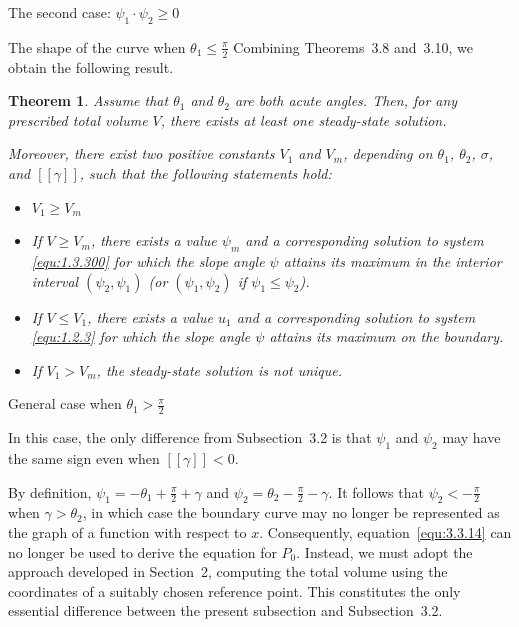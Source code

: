 \documentclass[letterpaper,reqno,10pt,twoside]{amsart}
\newtheorem{theorem}{Theorem}[section]
\theoremstyle{definition}
\theoremstyle{remark}
\begin{document}
\begin{section}{The second case: $\psi_1\cdot \psi_2\geq 0$ }
\begin{subsection}{The shape of the curve when $\theta_1\leq \frac{\pi}{2}$}
        Combining Theorems~3.8 and~3.10, we obtain the following result.


        \begin{theorem}

            Assume that $\theta_1$ and $\theta_2$ are both acute angles. Then, for any prescribed total volume $V$, there exists at least one steady-state solution.

Moreover, there exist two positive constants $V_1$ and $V_m$, depending on $\theta_1$, $\theta_2$, $\sigma$, and $[\![\gamma]\!]$, such that the following statements hold:
\begin{itemize}
\item $V_{1}\geq V_{m}$
\item If $V \ge V_m$, there exists a value $\psi_m$ and a corresponding solution to system \eqref{equ:1.3.300} for which the slope angle $\psi$ attains its maximum in the interior interval $(\psi_2,\psi_1)$ (or $(\psi_1,\psi_2)$ if $\psi_1 \le \psi_2$).

\item If $V \le V_1$, there exists a value $u_1$ and a corresponding solution to system \eqref{equ:1.2.3} for which the slope angle $\psi$ attains its maximum on the boundary.

\item If $V_1 > V_m$, the steady-state solution is not unique.
            \end{itemize}
            
            
        \end{theorem}
        
        \end{subsection}

        \begin{subsection}{General case when $\theta_1>\frac{\pi}{2}$}

            In this case, the only difference from Subsection~3.2 is that $\psi_1$ and $\psi_2$ may have the same sign even when $[\![\gamma]\!]<0$. 

            By definition, $\psi_1=-\theta_1+\frac{\pi}{2}+\gamma$ and $\psi_2=\theta_2-\frac{\pi}{2}-\gamma$. It follows that $\psi_2<-\frac{\pi}{2}$ when $\gamma>\theta_2$, in which case the boundary curve may no longer be represented as the graph of a function with respect to $x$. Consequently, equation~\eqref{equ:3.3.14} can no longer be used to derive the equation for $P_0$. Instead, we must adopt the approach developed in Section~2, computing the total volume using the coordinates of a suitably chosen reference point. This constitutes the only essential difference between the present subsection and Subsection~3.2.
            

\end{subsection}
\end{section}
\end{document}
